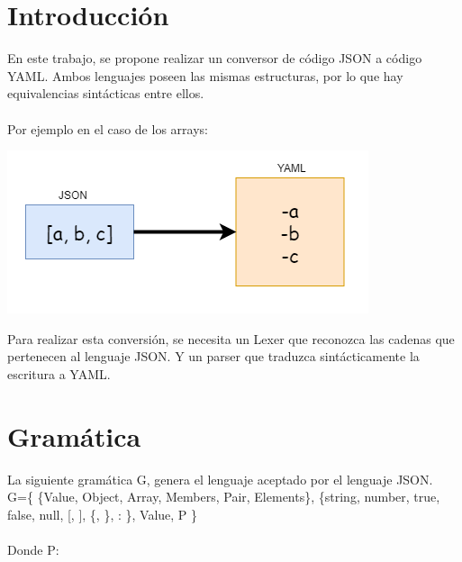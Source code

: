 \documentclass{article}
\begin{document}
\thispagestyle{empty}


\maketitle

\newpage

\tableofcontents
\newpage

\section{Introducción}

En este trabajo, se propone realizar un conversor de código JSON a código YAML. Ambos lenguajes poseen las mismas estructuras, por lo que hay equivalencias sintácticas entre ellos. \\ \\
Por ejemplo en el caso de los arrays: \\

\begin{center}
\includegraphics[scale=0.7]{img1.png}
\end{center}

Para realizar esta conversión, se necesita un Lexer que reconozca las cadenas que pertenecen al lenguaje JSON. Y un parser que traduzca sintácticamente la escritura a YAML. \\

\section{Gramática}

La siguiente gramática G, genera el lenguaje aceptado por el lenguaje JSON. \\
G=\{ \{Value, Object, Array, Members, Pair, Elements\}, \{string, number, true, false, null, [, ], \{, \}, : \}, Value, P \} \\ \\
Donde P: \\
\end{document}
